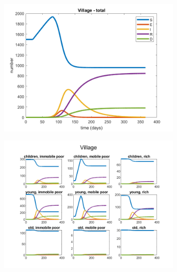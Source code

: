 \documentclass{article}
\begin{document}
\begin{figure}[H]
	\begin{subfigure}[b]{0.5\textwidth}
		\includegraphics[width=\textwidth]{no-economic-effect/weak-mitigation/Village-total}
	\end{subfigure}%
	\begin{subfigure}[b]{0.5\textwidth}
		\includegraphics[width=\textwidth]{no-economic-effect/weak-mitigation/Village-all-cat}
	\end{subfigure}
	

\end{figure}
\end{document}
